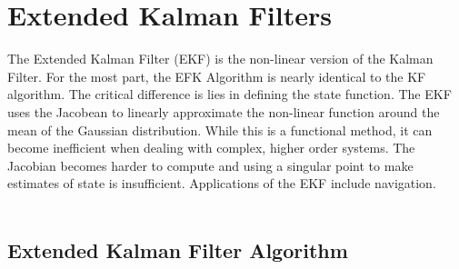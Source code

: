 \chapter{Extended Kalman Filters}
\label{Extended Kalman Filters}

The Extended Kalman Filter (EKF) is the non-linear version of the Kalman Filter. For the most part, the EFK Algorithm is nearly identical to the KF algorithm. The critical difference is lies in defining the state function. The EKF uses the Jacobean to linearly approximate the non-linear function around the mean of the Gaussian distribution. While this is a functional method, it can become inefficient when dealing with complex, higher order systems. The Jacobian becomes harder to compute and using a singular point to make estimates of state is insufficient. Applications of the EKF include navigation. \\ \\

\section{Extended Kalman Filter Algorithm}

